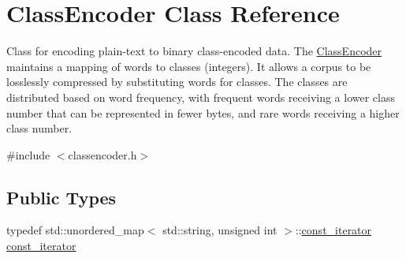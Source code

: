 \hypertarget{classClassEncoder}{}\section{Class\+Encoder Class Reference}
\label{classClassEncoder}


Class for encoding plain-\/text to binary class-\/encoded data. The \hyperlink{classClassEncoder}{Class\+Encoder} maintains a mapping of words to classes (integers). It allows a corpus to be losslessly compressed by substituting words for classes. The classes are distributed based on word frequency, with frequent words receiving a lower class number that can be represented in fewer bytes, and rare words receiving a higher class number.  




{\ttfamily \#include $<$classencoder.\+h$>$}

\subsection*{Public Types}
\begin{DoxyCompactItemize}
\item 
typedef std\+::unordered\+\_\+map$<$ std\+::string, unsigned int $>$\+::\hyperlink{classClassEncoder_afbc5a5bdbe889258e576f886a99e1427}{const\+\_\+iterator} \hyperlink{classClassEncoder_afbc5a5bdbe889258e576f886a99e1427}{const\+\_\+iterator}
\end{DoxyCompactItemize}
